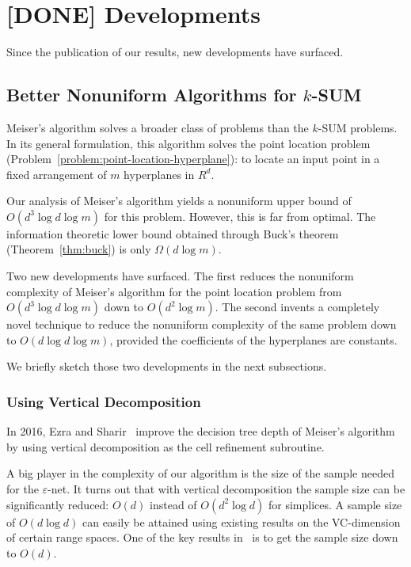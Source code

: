 \chapter{[DONE] Developments}

Since the publication of our results, new developments have surfaced.

\section{Better Nonuniform Algorithms for \(k\)-SUM}

Meiser's algorithm solves a broader class of problems than the \(k\)-SUM
problems. In its general formulation, this algorithm solves
the point location problem (Problem~\ref{problem:point-location-hyperplane}):
to locate an input point in a fixed arrangement of $m$ hyperplanes in $R^d$.

Our analysis of Meiser's algorithm yields a nonuniform upper bound of \(O(d^3 \log
d \log m)\) for this problem. However, this is far from optimal.
The information theoretic lower bound obtained through
Buck's theorem (Theorem~\ref{thm:buck}) is only \(\Omega(d \log m)\).

Two new developments have surfaced.
%
The first reduces the nonuniform complexity of Meiser's algorithm for the point
location problem from
\(O(d^3 \log d \log m)\) down to \(O(d^2 \log m)\).
%
The second invents a completely novel technique to reduce the nonuniform
complexity of the same problem down to \(O(d \log d \log m)\), provided the
coefficients of the hyperplanes are constants.

We briefly sketch those two developments in the next subsections.

\subsection{Using Vertical Decomposition}

In 2016, Ezra and Sharir~\cite{ES17} improve the decision tree depth of
Meiser's algorithm by using vertical decomposition as the cell refinement
subroutine.

A big player in the complexity of our algorithm is the size of the sample
needed for the \(\varepsilon\)-net. It turns out that with
vertical decomposition the sample size can be significantly reduced: $O(d)$
instead of $O(d^2 \log d)$ for simplices.
%
A sample size of $O(d \log d)$ can easily be attained using existing results on
the VC-dimension of certain range spaces. One of the key results in~\cite{ES17}
is to get the sample size down to $O(d)$.

